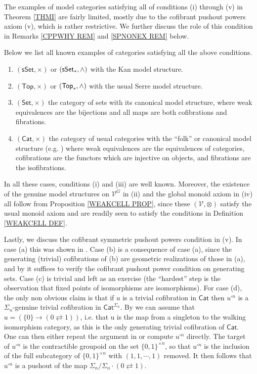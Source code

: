 \documentclass[a4paper,10pt
,draft
]{article}%
\numberwithin{equation}{section}
\numberwithin{figure}{section}
\theoremstyle{definition} %
\newcommand{\Cat}{\mathsf{Cat}}
\newcommand{\V}{\ensuremath{\mathcal V}}
\newcommand{\1}{\ensuremath{\mathbbm 1}}%
\begin{document}
The examples of 
model categories satisfying 
all of conditions (i) through (v)
in Theorem \ref{THMI}
are fairly limited, 
mostly due to 
the cofibrant pushout powers axiom (v),
which is rather restrictive.
We further discuss the role of this condition 
in Remarks 
\ref{CPPWHY REM} and
\ref{SPNONEX REM} below.

Below we list all known examples of categories satisfying all the above conditions.
\begin{enumerate}[label = (\alph*)]
\item $(\mathsf{sSet},\times)$ or $(\mathsf{sSet}_{\**},\wedge)$
with the Kan model structure.
\item $(\mathsf{Top},\times)$ or $(\mathsf{Top}_{\**},\wedge)$
with the usual Serre model structure.
\item $(\mathsf{Set},\times)$ the category of sets with its canonical model structure,
where weak equivalences are the bijections and all maps are both cofibrations and fibrations.
\item $(\Cat,\times)$ the category of usual categories
with the ``folk'' or canonical model structure (e.g. \cite{Rez})
where weak equivalences are the equivalences of categories,
cofibrations are the functors which are injective on objects,
and fibrations are the isofibrations.
\end{enumerate}
In all these cases, conditions (i) and (iii) %
are well known.
Moreover,
the existence of the genuine model structures on $\V^G$ in (ii)
and the global monoid axiom in (iv)
all follow from Proposition \ref{WEAKCELL PROP},
since these $(\V,\otimes)$ satisfy the usual monoid axiom and
are readily seen to satisfy the conditions in Definition \ref{WEAKCELL DEF}.


Lastly, we discuss the cofibrant symmetric pushout powers condition in (v).
In case (a) this was shown in 
\cite[Ex. 6.19]{BP_geo}.
Case (b) is a consequence of case (a), 
since the generating (trivial) cofibrations of (b) are geometric realizations of those in (a),
and by \cite[Rem. 6.17]{BP_geo}
it suffices to verify the cofibrant pushout power condition
on generating sets.
Case (c) is trivial and left as an exercise 
(the ``hardest'' step is the observation that fixed points of isomorphisms are isomorphisms).
For case (d), the only non obvious claim is that
if $u$ is a trivial cofibration in $\mathsf{Cat}$
then $u^{\square n}$
is a $\Sigma_n$-genuine trivial cofibration in $\mathsf{Cat}^{\Sigma_n}$.
By \cite[Rem. 6.17]{BP_geo}
we can assume that $u = \left(\{0\} \to (0\rightleftarrows 1)\right)$,
i.e. that u is the map from a singleton to the walking isomorphism category,
as this is the only generating trivial cofibration of 
$\mathsf{Cat}$.
One can then either repeat the argument in \cite[Ex. 6.19]{BP_geo}
or compute $u^{\square n}$ directly.
The target of $u^{\square n}$
is the contractible groupoid on the set $\{0,1\}^{\times n}$,
so that $u^{\square n}$
is the inclusion of the full subcategory of 
$\{0,1\}^{\times n}$
with $(1,1,\cdots,1)$ removed.
It then follows that $u^{\square n}$
is a pushout of the map
$\Sigma_n/\Sigma_n \cdot (0 \rightleftarrows 1)$.
\end{document}
